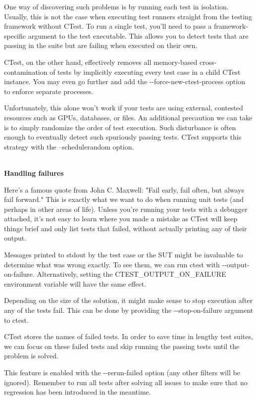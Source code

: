 One way of discovering such problems is by running each test in isolation. Usually, this is not the case when executing test runners straight from the testing framework without CTest. To run a single test, you'll need to pass a framework-specific argument to the test executable. This allows you to detect tests that are passing in the suite but are failing when executed on their own.

CTest, on the other hand, effectively removes all memory-based cross-contamination of tests by implicitly executing every test case in a child CTest instance. You may even go further and add the -{}-force-new-ctest-process option to enforce separate processes.

Unfortunately, this alone won't work if your tests are using external, contested resources such as GPUs, databases, or files. An additional precaution we can take is to simply randomize the order of test execution. Such disturbance is often enough to eventually detect such spuriously passing tests. CTest supports this strategy with the --schedulerandom option.

\hspace*{\fill} \\ %
\noindent
\textbf{Handling failures}

Here's a famous quote from John C. Maxwell: "Fail early, fail often, but always fail forward." This is exactly what we want to do when running unit tests (and perhaps in other areas of life). Unless you're running your tests with a debugger attached, it's not easy to learn where you made a mistake as CTest will keep things brief and only list tests that failed, without actually printing any of their output.

Messages printed to stdout by the test case or the SUT might be invaluable to determine what was wrong exactly. To see them, we can run ctest with -{}-output-on-failure. Alternatively, setting the CTEST\_OUTPUT\_ON\_FAILURE environment variable will have the same effect.

Depending on the size of the solution, it might make sense to stop execution after any of the tests fail. This can be done by providing the -{}-stop-on-failure argument to ctest.

CTest stores the names of failed tests. In order to save time in lengthy test suites, we can focus on these failed tests and skip running the passing tests until the problem is solved.

This feature is enabled with the -{}-rerun-failed option (any other filters will be ignored). Remember to run all tests after solving all issues to make sure that no regression has been introduced in the meantime.

